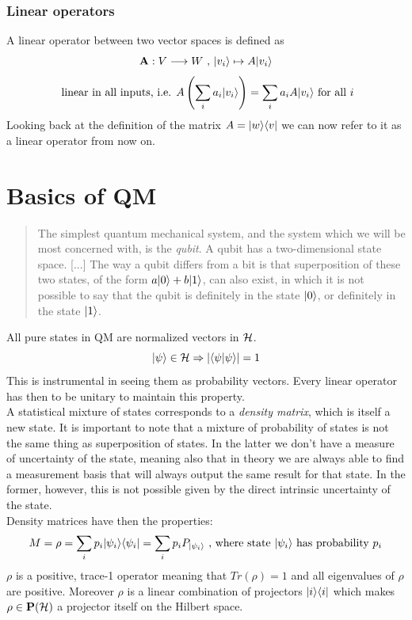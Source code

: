 	\subsubsection*{Linear operators}
	A linear operator between two vector spaces is defined as 
	$$ \mathbf{A}: V\longrightarrow W \text{  ,  }|v_i \rangle\mapsto A|v_i \rangle$$
	$$ \text{ linear in all inputs, i.e.  }  A\left( \sum_i a_i|v_i \rangle\right) = \sum_i a_i A|v_i \rangle \text{  for all } i $$ 
	Looking back at the definition of the matrix $ A = |w \rangle\langle v|$ we can now refer to it as a linear operator from now on.
	
	\section{Basics of QM}
	\begin{quotation}
		The simplest quantum mechanical system, and the system which we will be most concerned with, is the \emph{qubit}. A qubit has a two-dimensional state space. [...] 
		The way a qubit differs from a bit is that superposition of these two states, of the form $a|0 \rangle + b|1 \rangle$, can also exist, in which it is not possible to say that the qubit is definitely in the state $|0 \rangle$, or definitely in the state $|1 \rangle$.
		\cite{QC10th}
	\end{quotation}
	
	All pure states in QM are normalized vectors in $\mathcal{H}$.
	$$ |\psi \rangle\in\mathcal{H} \Rightarrow  \vert\langle\psi|\psi\rangle\vert = 1$$
	This is instrumental in seeing them as probability vectors. Every linear operator has then to be unitary to maintain this property.\\
	A statistical mixture of states corresponds to a \emph{density matrix}, which is itself a new state. It is important to note that a mixture of probability of states is not the same thing as superposition of states. In the latter we don't have a measure of uncertainty of the state, meaning also that in theory we are always able to find a measurement basis that will always output the same result for that state. In the former, however, this is not possible given by the direct intrinsic uncertainty of the state.\\
	Density matrices have then the properties:
	$$ M = \rho = \sum_i p_i |\psi_i \rangle\langle \psi_i| = \sum_i p_i P_{|\psi_i \rangle} \text{  , where state }|\psi_i \rangle\text{ has probability } p_i $$ 
	$\rho$ is a positive, trace-1 operator meaning that $Tr(\rho) = 1$ and all eigenvalues of $\rho$ are positive. Moreover $\rho$ is a linear combination of projectors $|i \rangle\langle i|$ which makes $\rho\in\mathbf{P}(\mathcal{H})$ a projector itself on the Hilbert space.
	
